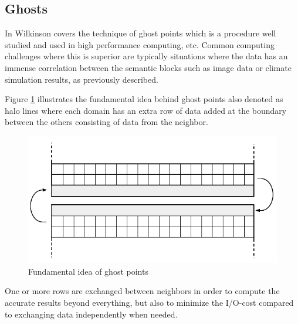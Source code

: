 \subsection{Ghosts}
In \cite{Wilkinson:1998:PPT:289352} Wilkinson \etal covers the technique of ghost points which is a procedure well studied and used in high performance computing, etc. Common computing challenges where this is superior are typically situations where the data has an immense correlation between the semantic blocks such as image data or climate simulation results, as previously described. 
\newline

Figure \ref{fig:ghost-points} illustrates the fundamental idea behind ghost points also denoted as halo lines where each domain has an extra row of data added at the boundary between the others consisting of data from the neighbor. 

\begin{figure}[ht!]
	\centering
	\includegraphics[scale=0.92]{pdf/ghost-points.pdf}
	\vspace*{3mm}
	\caption{Fundamental idea of ghost points \label{fig:ghost-points}}
	\vspace{2mm}
\end{figure}	

One or more rows are exchanged between neighbors in order to compute the accurate results beyond everything, but also to minimize the I/O-cost compared to exchanging data independently when needed.
\newline

